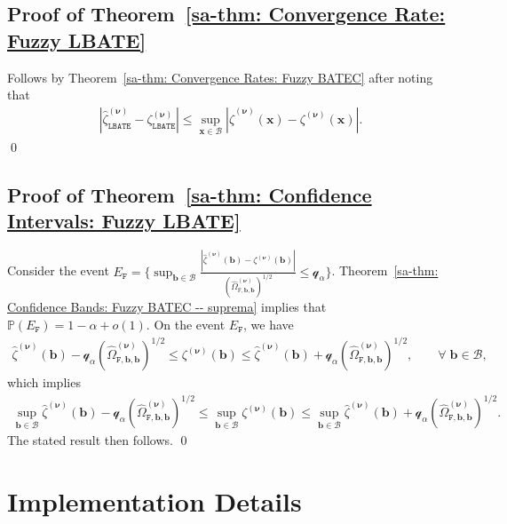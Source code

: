 \documentclass[10pt]{article}
\renewcommand{\P}{\mathbb{P}}
\newcommand{\bb}{\mathbf{b}}
\newcommand{\bx}{\mathbf{x}}
\newcommand{\bnu}{\boldsymbol{\nu}}
\newcommand{\B}{\mathcal{B}}
\newcommand{\q}{\mathcal{q}}
\begin{document}
\subsection{Proof of Theorem~\ref{sa-thm: Convergence Rate: Fuzzy LBATE}}

Follows by Theorem~\ref{sa-thm: Convergence Rates: Fuzzy BATEC} after noting that
\begin{align*}
    |\widehat{\zeta}_{\mathtt{LBATE}}^{(\bnu)} - \zeta_{\mathtt{LBATE}}^{(\bnu)}|
    \leq \sup_{\bx\in\B} |\widehat{\zeta}^{(\bnu)}(\bx) - \zeta^{(\bnu)}(\bx)|.
\end{align*}
\qed

\subsection{Proof of Theorem~\ref{sa-thm: Confidence Intervals: Fuzzy LBATE}}

Consider the event $E_{\mathtt{F}} = \Big\{\sup_{\bb \in \B} \frac{|\widehat{\zeta}^{(\bnu)}(\bb) - \zeta^{(\bnu)}(\bb)|}{(\widehat{\Omega}_{\mathtt{F},\bb,\bb}^{(\bnu)})^{1/2}} \leq \q_{\alpha}\Big\}$. Theorem~\ref{sa-thm: Confidence Bands: Fuzzy BATEC -- suprema} implies that $\P(E_{\mathtt{F}}) = 1 - \alpha + o(1)$. On the event $E_{\mathtt{F}}$, we have
\begin{align*}
    \widehat{\zeta}^{(\bnu)}(\bb) - \q_{\alpha}(\widehat{\Omega}_{\mathtt{F},\bb,\bb}^{(\bnu)})^{1/2}
    \leq \zeta^{(\bnu)}(\bb)
    \leq \widehat{\zeta}^{(\bnu)}(\bb) + \q_{\alpha}(\widehat{\Omega}_{\mathtt{F},\bb,\bb}^{(\bnu)})^{1/2}, \qquad \forall \; \bb \in \B,
\end{align*}
which implies
\begin{align*}
    \sup_{\bb \in \B}  \widehat{\zeta}^{(\bnu)}(\bb) - \q_{\alpha}(\widehat{\Omega}_{\mathtt{F},\bb,\bb}^{(\bnu)})^{1/2}
    \leq \sup_{\bb \in \B} \zeta^{(\bnu)}(\bb)
    \leq \sup_{\bb \in \B} \widehat{\zeta}^{(\bnu)}(\bb) + \q_{\alpha}(\widehat{\Omega}_{\mathtt{F},\bb,\bb}^{(\bnu)})^{1/2}.
\end{align*}
The stated result then follows.
\qed


\section{Implementation Details}\label{sa-sec: Implementation Details}
\end{document}

